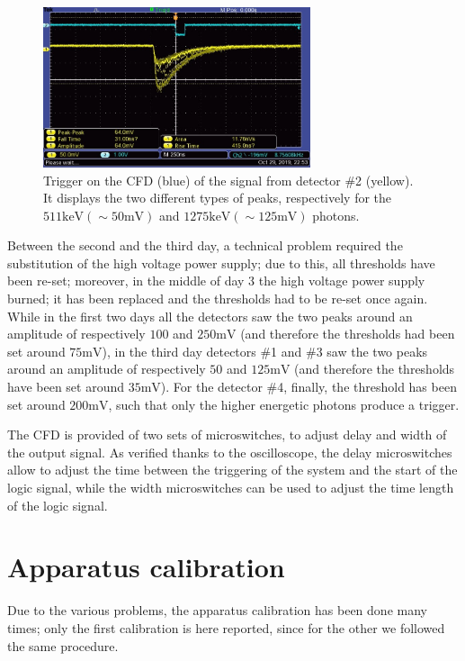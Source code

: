\documentclass[11pt,a4 paper]{article}
\begin{document}
\begin{figure}[H]
    \centering
    \includegraphics[width=0.7\textwidth]{img/TEK0001.JPG}
    \caption{Trigger on the CFD (blue) of the signal from detector \#2 (yellow). It displays the two different types of peaks, respectively for the $511\si{\kilo\electronvolt} (\sim 50\si{\milli\volt})$ and $1275\si{\kilo\electronvolt} (\sim 125\si{\milli\volt})$ photons.}
    \label{fig:oscilloscope}
\end{figure}

Between the second and the third day, a technical problem required the substitution of the high voltage power supply; due to this, all thresholds have been re-set; moreover, in the middle of day 3 the high voltage power supply burned; it has been replaced and the thresholds had to be re-set once again. While in the first two days all the detectors saw the two peaks around an amplitude of respectively $100$ and $250\si{\milli\volt}$ (and therefore the thresholds had been set around $75\si{\milli\volt}$), in the third day detectors \#1 and \#3 saw the two peaks around an amplitude of respectively $50$ and $125\si{\milli\volt}$ (and therefore the thresholds have been set around $35\si{\milli\volt}$). For the detector \#4, finally, the threshold has been set around $200\si{\milli\volt}$, such that only the higher energetic photons produce a trigger.

The CFD is provided of two sets of microswitches, to adjust delay and width of the output signal. As verified thanks to the oscilloscope, the delay microswitches allow to adjust the time between the triggering of the system and the start of the logic signal, while the width microswitches can be used to adjust the time length of the logic signal.



\section{Apparatus calibration}
Due to the various problems, the apparatus calibration has been done many times; only the first calibration is here reported, since for the other we followed the same procedure.
\end{document}
